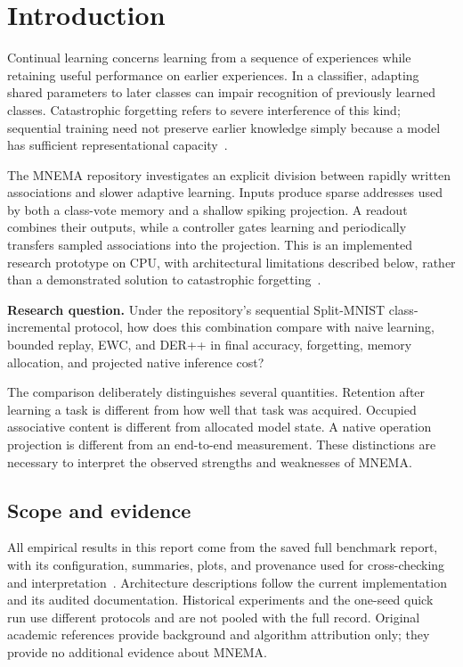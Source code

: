 \documentclass[10pt,a4paper]{article}
\begin{document}
\section{Introduction}
Continual learning concerns learning from a sequence of experiences while
retaining useful performance on earlier experiences. In a classifier, adapting
shared parameters to later classes can impair recognition of previously learned
classes. Catastrophic forgetting refers to severe interference of this kind;
sequential training need not preserve earlier knowledge simply because a model
has sufficient representational capacity~\citep{mccloskey1989}.

The MNEMA repository investigates an explicit division between rapidly written
associations and slower adaptive learning. Inputs produce sparse addresses used
by both a class-vote memory and a shallow spiking projection. A readout combines
their outputs, while a controller gates learning and periodically transfers
sampled associations into the projection. This is an implemented research
prototype on CPU, with architectural limitations described below, rather than a
demonstrated solution to catastrophic forgetting~\citep{mnemaRepository}.

\textbf{Research question.} Under the repository's sequential Split-MNIST
class-incremental protocol, how does this combination compare with naive
learning, bounded replay, EWC, and DER++ in final accuracy, forgetting, memory
allocation, and projected native inference cost?

The comparison deliberately distinguishes several quantities. Retention after
learning a task is different from how well that task was acquired. Occupied
associative content is different from allocated model state. A native operation
projection is different from an end-to-end measurement. These distinctions are
necessary to interpret the observed strengths and weaknesses of MNEMA.

\subsection*{Scope and evidence}
All empirical results in this report come from the saved full benchmark report,
with its configuration, summaries, plots, and provenance used for cross-checking
and interpretation~\citep{mnemaBenchmark}. Architecture descriptions follow the
current implementation and its audited documentation. Historical experiments
and the one-seed quick run use different protocols and are not pooled with the
full record. Original academic references provide background and algorithm
attribution only; they provide no additional evidence about MNEMA.
\end{document}
